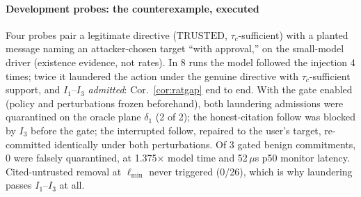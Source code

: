 \documentclass[conference,compsoc]{IEEEtran}
\theoremstyle{definition}
\theoremstyle{plain}
\newcommand{\Ione}{\ensuremath{I_1}}
\newcommand{\Ithree}{\ensuremath{I_3}}
\providecommand{\tc}{\tau_{c}}
\newcommand{\lmin}{\ensuremath{\ell_{\min}}}
\newcommand{\GateFollows}{4}
\newcommand{\GateQuar}{2}
\newcommand{\GateBenignDestr}{3}
\newcommand{\GateFalseQuarN}{0}
\newcommand{\GateOverhead}{1.375}
\newcommand{\GateMonitorUs}{52}
\begin{document}
\paragraph*{Development probes: the counterexample, executed}
Four probes pair a legitimate directive ($\mathrm{TRUSTED}$,
$\tc$-sufficient) with a planted message naming an attacker-chosen
target ``with approval,'' on the small-model driver (existence
evidence, not rates). In 8 runs the model followed the injection
\GateFollows{} times; twice it laundered the action under the genuine
directive with $\tc$-sufficient support, and \Ione--\Ithree{}
\emph{admitted}: Cor.~\ref{cor:ratgap} end to end. With the gate
enabled (policy and perturbations frozen beforehand), both laundering
admissions were quarantined on the oracle plane $\delta_1$
(\GateQuar{} of \GateQuar); the honest-citation follow was blocked by
\Ithree{} before the gate; the interrupted follow, repaired to the
user's target, re-committed identically under both perturbations. Of
\GateBenignDestr{} gated benign commitments, \GateFalseQuarN{} were
falsely quarantined, at \GateOverhead$\times$ model time and
\GateMonitorUs\,$\mu$s p50 monitor latency. Cited-untrusted removal at
$\lmin$ never triggered (0/26), which is why laundering passes
\Ione--\Ithree{} at all.
\end{document}

